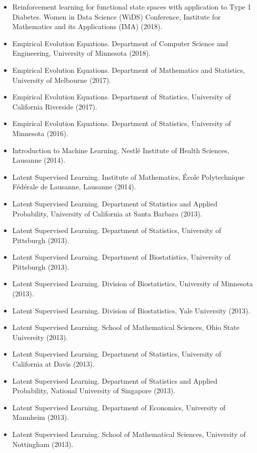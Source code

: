 \documentclass{harnon-cv}
\begin{document}
{		%
		\begin{itemize}
			\item Reinforcement learning for functional state spaces with application to Type 1 Diabetes. Women in Data Science (WiDS) Conference, Institute for Mathematics and its Applications (IMA) (2018).
			\item Empirical Evolution Equations. Department of Computer Science and Engineering, University of Minnesota (2018).
			\item Empirical Evolution Equations. Department of Mathematics and Statistics, University of Melbourne (2017).
			\item Empirical Evolution Equations. Department of Statistics, University of California Riverside (2017).
			\item Empirical Evolution Equations. Department of Statistics, University of Minnesota (2016).
			\item Introduction to Machine Learning. Nestl\'{e} Institute of Health Sciences, Lausanne (2014).
			\item Latent Supervised Learning. Institute of Mathematics, \'{E}cole Polytechnique F\'{e}d\'{e}rale de Lausanne, Lausanne (2014).
			\item Latent Supervised Learning. Department of Statistics and Applied Probability, University of California at Santa Barbara (2013).					
			\item Latent Supervised Learning. Department of Statistics, University of Pittsburgh (2013).								
			\item Latent Supervised Learning. Department of Biostatistics, University of Pittsburgh (2013).							
			\item Latent Supervised Learning. Division of Biostatistics, University of Minnesota (2013).				
			\item Latent Supervised Learning. Division of Biostatistics, Yale University (2013).		
			\item Latent Supervised Learning. School of Mathematical Sciences, Ohio State University (2013).
			\item Latent Supervised Learning. Department of Statistics, University of California at Davis (2013).		
			\item Latent Supervised Learning. Department of Statistics and Applied Probability, National University of Singapore (2013).
			\item Latent Supervised Learning. Department of Economics, University of Mannheim (2013).
			\item Latent Supervised Learning. School of Mathematical Sciences, University of Nottingham (2013).
		\end{itemize}
		
}
\end{document}
